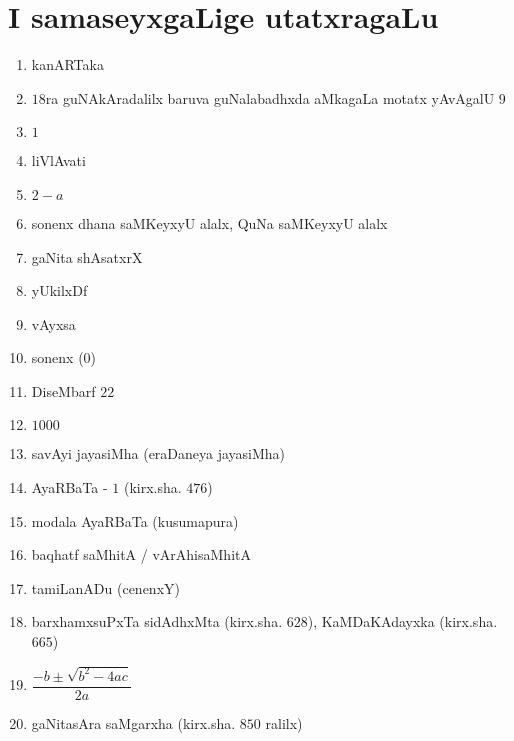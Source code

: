 \chapter{I samaseyxgaLige utatxragaLu}\label{chap24}

\begin{enumerate}
  \renewcommand{\labelenumi}{\rm(\theenumi)}
  \itemsep=1pt
\item kanARTaka

\item $18$ra guNAkAradalilx baruva guNalabadhxda aMkagaLa motatx yAvAgalU $9$

\item $1$

\item liVlAvati 

\item $2-a$

\item sonenx dhana saMKeyxyU alalx, QuNa saMKeyxyU alalx 

\item gaNita shAsatxrX

\item yUkilxDf

\item vAyxsa

\item sonenx ($0$)

\item DiseMbarf $22$

\item $1000$

\item savAyi jayasiMha (eraDaneya jayasiMha)

\item AyaRBaTa - $1$ (kirx.sha. $476$)

\item modala AyaRBaTa (kusumapura)

\item baqhatf saMhitA / vArAhisaMhitA 

\item tamiLanADu (cenenxY)

\item barxhamxsuPxTa sidAdhxMta (kirx.sha. $628$), KaMDaKAdayxka (kirx.sha. $665$)

\item $\dfrac{-b \pm \sqrt{b^2 - 4ac}}{2a}$

\item gaNitasAra saMgarxha (kirx.sha. $850$ ralilx)


\end{enumerate}
